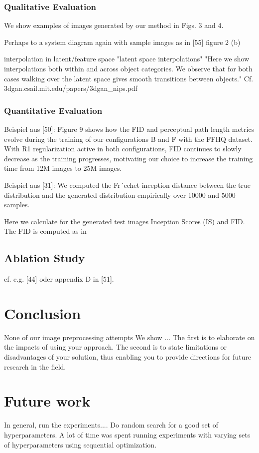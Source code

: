 \documentclass[12pt,a4paper]{article}
\begin{document}
\subsubsection{Qualitative Evaluation}
We show examples of images generated by our method in Figs. 3 and 4.

\par Perhaps to a system diagram again with sample images as in [55] figure 2 (b)

interpolation in latent/feature space
"latent space interpolations"
"Here we show interpolations both within and across object categories. We observe that for both cases walking over the latent space gives smooth transitions between objects." Cf. 3dgan.csail.mit.edu/papers/3dgan\_nips.pdf

\subsubsection{Quantitative Evaluation}
Beispiel aus [50]: Figure 9 shows how the FID and perceptual path length metrics evolve during the training of our configurations B and F with the FFHQ dataset. With R1 regularization active in both configurations, FID continues to slowly decrease as the training progresses, motivating our choice to increase the training time from 12M images to 25M images.

Beispiel aus [31]: We computed the Fr´echet inception distance between the true distribution and the generated
distribution empirically over 10000 and 5000 samples.

Here we calculate for the generated test images Inception Scores (IS) and FID. The FID is computed as in 


\subsection{Ablation Study}
cf. e.g. [44] oder appendix D in [51].

\section{Conclusion}
None of our image preprocessing attempts
We show ...
The first is
to elaborate on the impacts of using your approach. The
second is to state limitations or disadvantages of your solution,
thus enabling you to provide directions for future
research in the field.

\section{Future work}
In general, run the experiments.... Do random search for a good set of hyperparameters. A lot of time was spent running experiments with varying sets of hyperparameters using sequential optimization.
\end{document}
